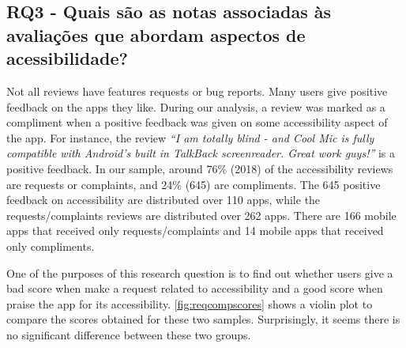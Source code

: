 \subsection{RQ3 - Quais são as notas associadas às avaliações que abordam aspectos de acessibilidade?}


Not all reviews have features requests or bug reports. Many users give positive feedback on the apps they like. 
During our analysis, a review was marked as a compliment when a positive feedback was given on some accessibility aspect of the app. 
For instance, the review \textit{``I am totally blind - and Cool Mic is fully compatible with Android's built in TalkBack screenreader. Great work guys!''} is a positive feedback.
In our sample, around 76\% (2018) of the accessibility reviews are requests or complaints, and 24\% (645) are compliments. 
The 645 positive feedback on accessibility are distributed over 110 apps, while the requests/complaints reviews are distributed over 262 apps. There are 166 mobile apps that received only requests/complaints and 14 mobile apps that received only compliments.

One of the purposes of this research question is to find out whether users give a bad score when make a request related to accessibility and a good score when praise the app for its accessibility. 
\autoref{fig:reqcompscores} shows a violin plot to compare the scores obtained for these two samples. Surprisingly, it seems there is no significant difference between these two groups. 

